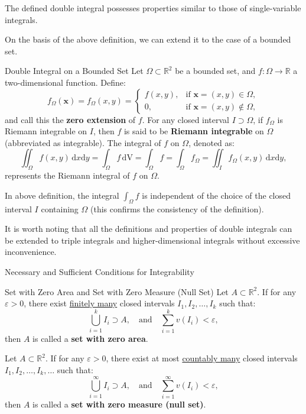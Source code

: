 \documentclass[11pt]{../../TexTemplate/elegantbook}
\begin{document}
The defined double integral possesses properties similar to those of single-variable integrals.

On the basis of the above definition, we can extend it to the case of a bounded set.

\begin{definition}{Double Integral on a Bounded Set}
    Let \( \Omega \subset \mathbb{R}^2 \) be a bounded set, and \( f: \Omega \to \mathbb{R} \) a two-dimensional function. 
    Define:
    \[
    f_\Omega(\mathbf{x}) = f_\Omega(x, y) =
    \begin{cases} 
    f(x, y), & \text{if } \mathbf{x} = (x, y) \in \Omega, \\
    0, & \text{if } \mathbf{x} = (x, y) \not\in \Omega,
    \end{cases}
    \]
    and call this the \textbf{zero extension} of \( f \). 
    For any closed interval \( I \supset \Omega \), if \( f_\Omega \) is Riemann integrable on \( I \), 
    then \( f \) is said to be \textbf{Riemann integrable} on \( \Omega \) (abbreviated as integrable). 
    The integral of \( f \) on \( \Omega \), denoted as:
    \[
    \iint_\Omega f(x, y) \, \mathrm{d}x \mathrm{d}y = 
    \int_\Omega f \, \mathrm{dV} = \int_{\Omega} f = \int_{\Omega} f_\Omega = 
    \iint_I f_\Omega(x, y) \, \mathrm{d}x \mathrm{d}y,
    \]
    represents the Riemann integral of \( f \) on \( \Omega \).
\end{definition}

In above definition, the integral \( \int_\Omega f \) is independent of the choice of 
the closed interval \( I \) containing \( \Omega \) (this confirms the consistency of the definition).

It is worth noting that all the definitions and properties of double integrals 
can be extended to triple integrals and higher-dimensional integrals without excessive inconvenience.

\begin{leftbarTitle}{Necessary and Sufficient Conditions for Integrability}\end{leftbarTitle}

\begin{definition}{Set with Zero Area and Set with Zero Measure (Null Set)}
    Let \( A \subset \mathbb{R}^2 \). If for any \( \varepsilon > 0 \), 
    there exist \underline{finitely many} closed intervals \( I_1, I_2, \dots, I_k \) such that:
    \[
    \bigcup_{i=1}^k I_i \supset A, \quad \text{and} \quad \sum_{i=1}^k v(I_i) < \varepsilon,
    \]
    then \( A \) is called a \textbf{set with zero area}.

    Let \( A \subset \mathbb{R}^2 \). If for any \( \varepsilon > 0 \), 
    there exist at most \underline{countably many} closed intervals \( I_1, I_2, \dots, I_k, \dots \) such that:
    \[
    \bigcup_{i=1}^\infty I_i \supset A, \quad \text{and} \quad \sum_{i=1}^\infty v(I_i) < \varepsilon,
    \]
    then \( A \) is called a \textbf{set with zero measure (null set)}.
\end{definition}
\end{document}
